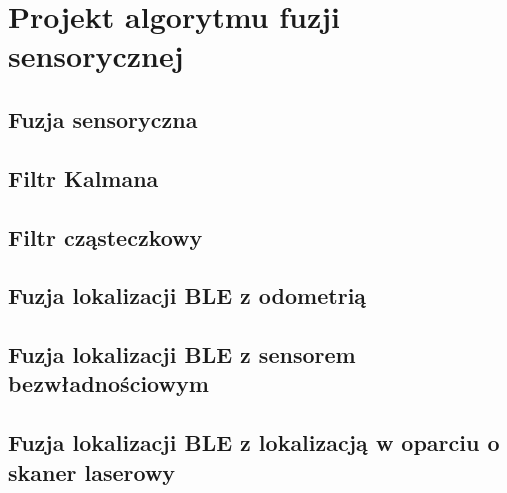 \chapter{Projekt algorytmu fuzji sensorycznej}
\label{ch:fuzja}

\section{Fuzja sensoryczna}

\section{Filtr Kalmana}

\section{Filtr cząsteczkowy}

\section{Fuzja lokalizacji BLE z odometrią}

\section{Fuzja lokalizacji BLE z sensorem bezwładnościowym}

\section{Fuzja lokalizacji BLE z lokalizacją w oparciu o skaner laserowy}
 

